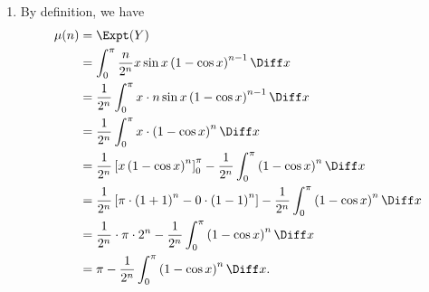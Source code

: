 \begin{enumerate}
    \item By definition, we have
          \begin{align*}
              \mu(n) & = \Expt(Y)                                                                                                                                                   \\
                     & = \int_{0}^{\pi} \frac{n}{2^n} x \sin x \left(1 - \cos x\right)^{n - 1} \Diff x                                                                              \\
                     & = \frac{1}{2^n} \int_{0}^{\pi} x \cdot n \sin x \left(1 - \cos x\right)^{n - 1} \Diff x                                                                      \\
                     & = \frac{1}{2^n} \int_{0}^{\pi} x \cdot \left(1 - \cos x\right)^n \Diff x                                                                                     \\
                     & = \frac{1}{2^n} \left[x \left(1 - \cos x \right)^{n}\right]_{0}^{\pi} - \frac{1}{2^n} \int_{0}^{\pi} \left(1 - \cos x\right)^{n} \Diff x                     \\
                     & = \frac{1}{2^n} \left[\pi \cdot \left(1 + 1 \right)^n - 0 \cdot \left(1 - 1\right)^n\right] - \frac{1}{2^n} \int_{0}^{\pi} \left(1 - \cos x\right)^n \Diff x \\
                     & = \frac{1}{2^n} \cdot \pi \cdot 2^n - \frac{1}{2^n} \int_{0}^{\pi} \left(1 - \cos x\right)^n \Diff x                                                         \\
                     & = \pi - \frac{1}{2^n} \int_{0}^{\pi} \left(1 - \cos x \right)^n \Diff x.
          \end{align*}


\end{enumerate}
